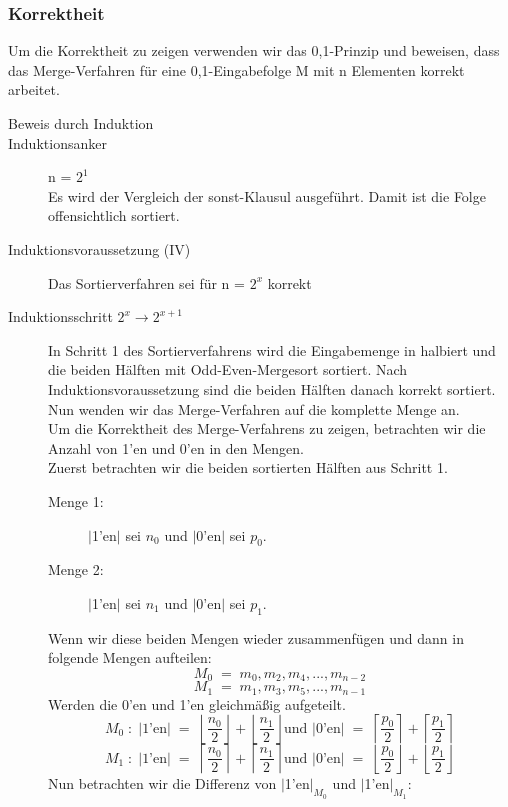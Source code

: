 \documentclass[11pt,ngerman]{article}
\begin{document}
\subsubsection{Korrektheit}
Um die Korrektheit zu zeigen verwenden wir das 0,1-Prinzip und beweisen, dass das Merge-Verfahren für eine 0,1-Eingabefolge M mit n Elementen korrekt arbeitet.
\begin{description}
\item[Beweis durch Induktion]
\item[Induktionsanker] n = $2^1$\\ Es wird der Vergleich der \glqq sonst\grqq -Klausul ausgeführt. Damit ist die Folge offensichtlich sortiert.
\item[Induktionsvoraussetzung (IV)] Das Sortierverfahren sei für n = $2^x$ korrekt
\item[Induktionsschritt  $2^x \rightarrow 2^{x+1}$]
In Schritt 1 des Sortierverfahrens wird die Eingabemenge in halbiert und die beiden Hälften mit Odd-Even-Mergesort sortiert. Nach In\-duk\-tions\-vor\-aus\-set\-zung sind die beiden Hälften danach korrekt sortiert. Nun wenden wir das Merge-Verfahren auf die komplette Menge an.\\Um die Korrektheit des Merge-Verfahrens zu zeigen, betrachten wir die Anzahl von 1'en und 0'en in den Mengen.\\Zuerst betrachten wir die beiden sortierten Hälften aus Schritt 1. 
\begin{description}
\item[Menge 1:] $|$1'en$|$ sei $n_0$ und $|$0'en$|$ sei $p_0$.
\item[Menge 2:] $|$1'en$|$ sei $n_1$ und $|$0'en$|$ sei $p_1$.
\end{description}
 Wenn wir diese beiden Mengen wieder zusammenfügen und dann in folgende Mengen aufteilen: 
$$M_0 \; = \; m_0, m_2, m_4, ..., m_{n-2}$$ 
$$M_1 \; = \; m_1, m_3, m_5, ..., m_{n-1}$$ 
Werden die 0'en und 1'en \glqq gleichmäßig\grqq{} aufgeteilt. 
$$M_0 \; :\; | \text{1'en} | \; = \;\left\lfloor \frac{n_0}{2} \right\rfloor + \left\lfloor \frac{n_1}{2} \right\rfloor \text{und $|$0'en$|$} \;=\; \left\lceil \frac{p_0}{2} \right\rceil + \left\lceil \frac{p_1}{2} \right\rceil$$
$$M_1 \; :\; | \text{1'en} | \; = \;\left\lceil \frac{n_0}{2} \right\rceil + \left\lceil \frac{n_1}{2} \right\rceil  \text{und $|$0'en$|$} \;=\; \left\lfloor \frac{p_0}{2} \right\rfloor + \left\lfloor \frac{p_1}{2} \right\rfloor$$
Nun betrachten wir die Differenz von $|$1'en$|_{M_0}$ und $|$1'en$|_{M_1}$:
\begin{description}

\end{description}
\end{description}
\end{document}
